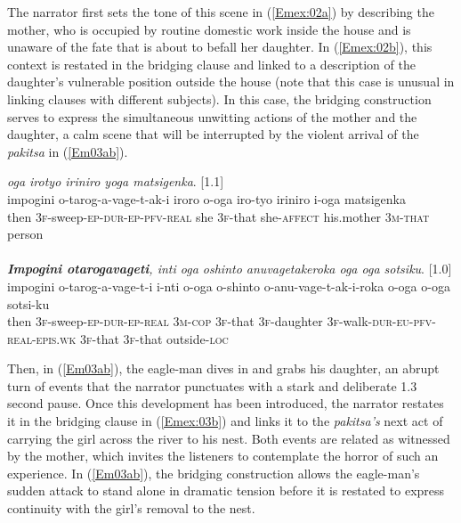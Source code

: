 \documentclass[output=paper]{LSP/langsci}
\begin{document}
The narrator first sets the tone of this scene in (\ref{Emex:02a}) by describing the mother, who is occupied by routine domestic work inside the house and is unaware of the fate that is about to befall her daughter. In (\ref{Emex:02b}), this context is restated in the bridging clause and linked to a description of the daughter’s vulnerable position outside the house (note that this case is unusual in linking clauses with different subjects). In this case, the bridging construction serves to express the simultaneous unwitting actions of the mother and the daughter, a calm scene that will be interrupted by the violent arrival of the \textit{pakitsa} in (\ref{Em03ab}).

\begin{exe}
\ex \label{Em02ab}
\begin{xlist}
\ex \label{Emex:02a}
\glt \textit{\underline{} oga irotyo iriniro yoga matsigenka}. [1.1]\\
\gll impogini o-tarog-a-vage-t-ak-i iroro o-oga iro-tyo iriniro i-oga matsigenka\\
 then \textsc{3f}-sweep\textsc{-ep-dur-ep-pfv-real} she \textsc{3f-}that she\textsc{-affect} his.mother \textsc{3m-that} person\\
\glt {}\\
\ex \label{Emex:02b}
\glt \textit{\textbf{Impogini otarogavageti}, inti oga oshinto anuvagetakeroka oga oga sotsiku}. [1.0]\\
\gll impogini o-tarog-a-vage-t-i i-nti o-oga o-shinto o-anu-vage-t-ak-i-roka o-oga o-oga sotsi-ku\\     	      
   then \textsc{3f-}sweep\textsc{-ep-dur-ep-real} \textsc{3m-cop} \textsc{3f-}that \textsc{3f-}daughter \textsc{3f-}walk\textsc{-dur-eu-pfv-real-epis.wk} \textsc{3f-}that \textsc{3f-}that outside\textsc{-loc}\\
\glt {}
\end{xlist}
\end{exe}


Then, in (\ref{Em03ab}), the eagle-man dives in and grabs his daughter, an abrupt turn of events that the narrator punctuates with a stark and deliberate 1.3 second pause. Once this development has been introduced, the narrator restates it in the bridging clause in (\ref{Emex:03b}) and links it to the \textit{pakitsa’s} next act of carrying the girl across the river to his nest. Both events are related as witnessed by the mother, which invites the listeners to contemplate the horror of such an experience. In (\ref{Em03ab}), the bridging construction allows the eagle-man’s sudden attack to stand alone in dramatic tension before it is restated to express continuity with the girl’s removal to the nest. 
\end{document}
